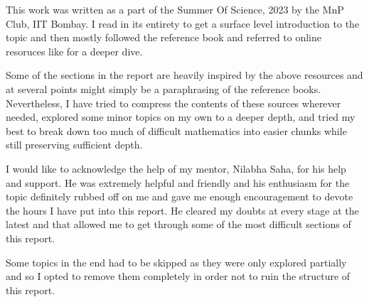		This work was written as a part of the Summer Of Science, 2023 by the MnP Club, IIT Bombay. I read in its entirety \cite{CodeBook} to get a surface level introduction to the topic and then mostly followed the reference book \cite{Silverman} and referred to online resoruces like \cite{Hypr} for a deeper dive. \par Some of the sections in the report are heavily inspired by the above resources and at several points might simply be a paraphrasing of the reference books. Nevertheless, I have tried to compress the contents of these sources wherever needed, explored some minor topics on my own to a deeper depth, and tried my best to break down too much of difficult mathematics into easier chunks while still preserving sufficient depth. \par I would like to acknowledge the help of my mentor, Nilabha Saha, for his help and support. He was extremely helpful and friendly and his enthusiasm for the topic definitely rubbed off on me and gave me enough encouragement to devote the hours I have put into this report. He cleared my doubts at every stage at the latest and that allowed me to get through some of the most difficult sections of this report.\par Some topics in the end had to be skipped as they were only explored partially and so I opted to remove them completely in order not to ruin the structure of this report.\normalsize